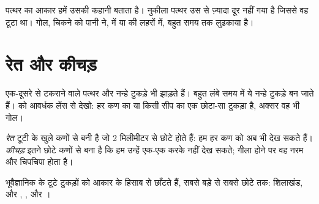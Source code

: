 \begin{remark}[पत्थर का आकार पढ़ना]\label{rem:g3:stones-pebbles-sand:shape}
पत्थर का आकार हमें उसकी कहानी बताता है। नुकीला पत्थर उस  से ज़्यादा
दूर नहीं गया है जिससे वह टूटा था। गोल, चिकने  को पानी ने,  में या
 की लहरों में, बहुत समय तक लुढ़काया है।
\end{remark}

\section{रेत और कीचड़}

एक-दूसरे से टकराने वाले पत्थर और  नन्हे टुकड़े भी झाड़ते हैं। बहुत लंबे
समय में ये नन्हे टुकड़े  बन जाते हैं।  को आवर्धक लेंस से देखो: हर कण
 का या किसी सीप का एक छोटा-सा टुकड़ा है, अक्सर वह भी गोल।

\begin{definition}[रेत और कीचड़]\label{def:g3:stones-pebbles-sand:sand}
\emph{रेत} टूटी  के खुले कणों से बनी है जो 2 मिलीमीटर से
छोटे होते हैं: हम हर कण को अब भी देख सकते हैं। \emph{कीचड़}
इतने छोटे कणों से बना है कि हम उन्हें एक-एक करके नहीं देख सकते; गीला होने
पर वह नरम और चिपचिपा होता है।
\end{definition}

भूवैज्ञानिक  के टूटे टुकड़ों को आकार के हिसाब से छाँटते हैं, सबसे
बड़े से सबसे छोटे तक: शिलाखंड,  और , , और ।

